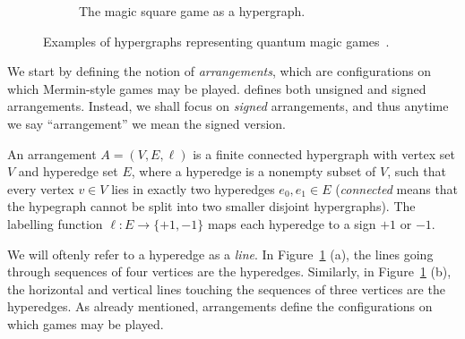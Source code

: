 \documentclass{llncs}
\begin{document}
\begin{figure}[htbp]
\begin{subfigure}[t]{0.49\textwidth}
\begin{center}
    \end{center}
    \caption{The magic square game as a hypergraph.}
  \end{subfigure}
  \caption{Examples of hypergraphs representing quantum magic games~\cite{arkhipov2012}.\label{fig:as-graph}}
\end{figure}

We start by defining the notion of \emph{arrangements}, which are
configurations on which Mermin-style games may be
played. \cite{arkhipov2012} defines both unsigned and signed
arrangements. Instead, we shall focus  on \emph{signed}
arrangements, and thus anytime we say ``arrangement'' we mean the
signed version.

\begin{definition}\label{def:arrangement}
  An arrangement \(A = (V, E, \ell)\) is a finite connected hypergraph
  with vertex set \(V\) and hyperedge set \(E\), where a hyperedge is
  a nonempty subset of \(V\), such that every vertex \(v \in V\) lies
  in exactly two hyperedges \(e_{0}, e_{1} \in E\) (\emph{connected}
  means that the hypegraph cannot be split into two smaller disjoint
  hypergraphs). The labelling function \(\ell\colon E \to \{+1, -1\}\)
  maps each hyperedge to a sign \(+1\) or \(-1\).
\end{definition}

We will oftenly refer to a hyperedge as a \emph{line}. In
Figure~\ref{fig:as-graph} (a), the lines going through sequences of
four vertices are the hyperedges. Similarly, in
Figure~\ref{fig:as-graph} (b), the horizontal and vertical lines
touching the sequences of three vertices are the hyperedges.  As
already mentioned, arrangements define the configurations on which
games may be played.
\end{document}
